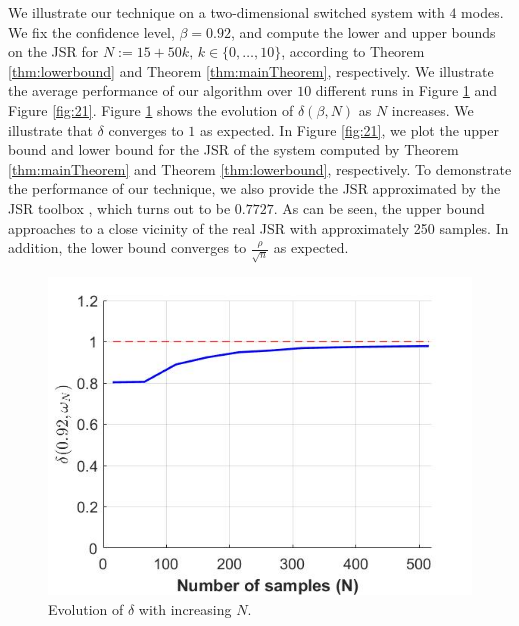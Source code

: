 We illustrate our technique on a two-dimensional switched system with $4$ modes. We fix the confidence level, \mbox{$\beta = 0.92$}, and compute the lower and upper bounds on the JSR for $N:=15+50k,\, k \in\{0, \ldots, 10\}$, according to Theorem \ref{thm:lowerbound} and Theorem \ref{thm:mainTheorem}, respectively. We illustrate the average performance of our algorithm over $10$ different runs in Figure \ref{fig:11} and Figure \ref{fig:21}. Figure \ref{fig:11} shows the evolution of $\delta(\beta, N)$ as $N$ increases. We illustrate that $\delta$ converges to $1$ as expected. In Figure \ref{fig:21}, we plot the upper bound and lower bound for the JSR of the system computed by Theorem \ref{thm:mainTheorem} and Theorem \ref{thm:lowerbound}, respectively. To demonstrate the performance of our technique, we also provide the JSR approximated by the JSR toolbox \cite{jsrtoolbox}, which turns out to be $0.7727$. As can be seen, the upper bound approaches to a close vicinity of the real JSR with approximately 250 samples. In addition, the lower bound converges to $\frac{\rho}{\sqrt{n}}$ as expected.

\begin{figure}
\begin{center}
\includegraphics[trim = 5mm 5mm 5mm 5mm, scale=0.35]{delta1.jpg}

\caption{Evolution of $\delta$ with increasing $N$.}
\label{fig:11}
\end{center}
\end{figure}

